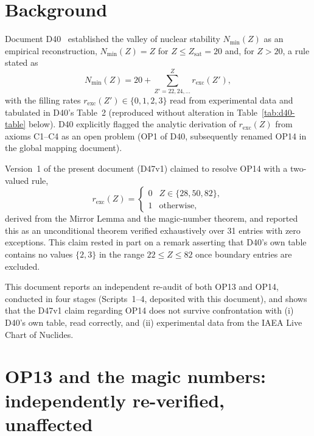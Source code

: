 \documentclass[12pt,a4paper]{article}
\theoremstyle{plain}
\theoremstyle{definition}
\theoremstyle{remark}
\newcommand{\Nmin}{N_{\min}}
\newcommand{\rexc}{r_{\mathrm{exc}}}
\newcommand{\Zsat}{Z_{\mathrm{sat}}}
\begin{document}
\tableofcontents
\newpage

\section{Background}
\label{sec:background}

Document D40~\citep{PDL_D40_2026} established the valley of nuclear stability $\Nmin(Z)$ as an empirical reconstruction, $\Nmin(Z)=Z$ for $Z\le\Zsat=20$ and, for $Z>20$, a rule stated as
\begin{equation}
\Nmin(Z) = 20 + \sum_{Z'=22,24,\ldots}^{Z} \rexc(Z'),
\label{eq:d40-original}
\end{equation}
with the filling rates $\rexc(Z')\in\{0,1,2,3\}$ read from experimental data and tabulated in D40's Table~2 (reproduced without alteration in Table~\ref{tab:d40-table} below). D40 explicitly flagged the analytic derivation of $\rexc(Z)$ from axioms C1--C4 as an open problem (OP1 of D40, subsequently renamed OP14 in the global mapping document).

Version~1 of the present document (D47v1) claimed to resolve OP14 with a two-valued rule,
\begin{equation}
\rexc(Z) = \begin{cases} 0 & Z\in\{28,50,82\},\\ 1 & \text{otherwise,}\end{cases}
\label{eq:d47v1-rule}
\end{equation}
derived from the Mirror Lemma and the magic-number theorem, and reported this as an unconditional theorem verified exhaustively over 31 entries with zero exceptions. This claim rested in part on a remark asserting that D40's own table contains no values $\{2,3\}$ in the range $22\le Z\le82$ once boundary entries are excluded.

This document reports an independent re-audit of both OP13 and OP14, conducted in four stages (Scripts~1--4, deposited with this document), and shows that the D47v1 claim regarding OP14 does not survive confrontation with (i) D40's own table, read correctly, and (ii) experimental data from the IAEA Live Chart of Nuclides.

\section{OP13 and the magic numbers: independently re-verified, unaffected}
\label{sec:op13}
\end{document}

